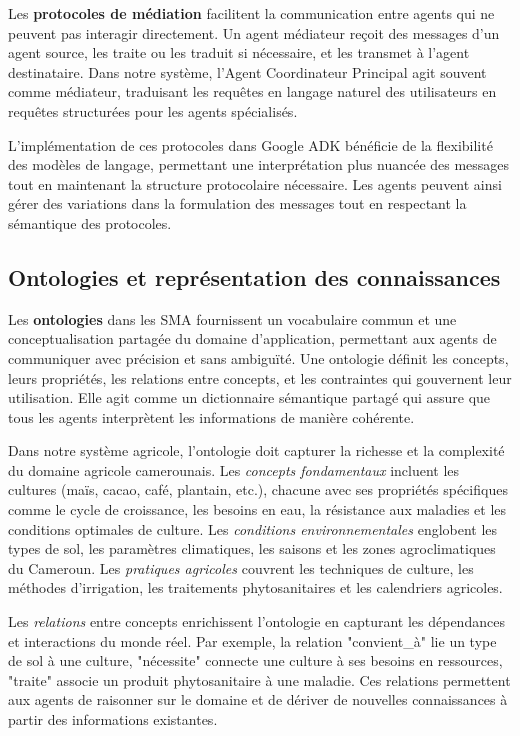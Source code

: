 Les \textbf{protocoles de médiation} facilitent la communication entre agents qui ne peuvent pas interagir directement. Un agent médiateur reçoit des messages d'un agent source, les traite ou les traduit si nécessaire, et les transmet à l'agent destinataire. Dans notre système, l'Agent Coordinateur Principal agit souvent comme médiateur, traduisant les requêtes en langage naturel des utilisateurs en requêtes structurées pour les agents spécialisés.

L'implémentation de ces protocoles dans Google ADK bénéficie de la flexibilité des modèles de langage, permettant une interprétation plus nuancée des messages tout en maintenant la structure protocolaire nécessaire. Les agents peuvent ainsi gérer des variations dans la formulation des messages tout en respectant la sémantique des protocoles.

\subsection{Ontologies et représentation des connaissances}

Les \textbf{ontologies} dans les SMA fournissent un vocabulaire commun et une conceptualisation partagée du domaine d'application, permettant aux agents de communiquer avec précision et sans ambiguïté. Une ontologie définit les concepts, leurs propriétés, les relations entre concepts, et les contraintes qui gouvernent leur utilisation. Elle agit comme un dictionnaire sémantique partagé qui assure que tous les agents interprètent les informations de manière cohérente.

Dans notre système agricole, l'ontologie doit capturer la richesse et la complexité du domaine agricole camerounais. Les \emph{concepts fondamentaux} incluent les cultures (maïs, cacao, café, plantain, etc.), chacune avec ses propriétés spécifiques comme le cycle de croissance, les besoins en eau, la résistance aux maladies et les conditions optimales de culture. Les \emph{conditions environnementales} englobent les types de sol, les paramètres climatiques, les saisons et les zones agroclimatiques du Cameroun. Les \emph{pratiques agricoles} couvrent les techniques de culture, les méthodes d'irrigation, les traitements phytosanitaires et les calendriers agricoles.

Les \emph{relations} entre concepts enrichissent l'ontologie en capturant les dépendances et interactions du monde réel. Par exemple, la relation "convient\_à" lie un type de sol à une culture, "nécessite" connecte une culture à ses besoins en ressources, "traite" associe un produit phytosanitaire à une maladie. Ces relations permettent aux agents de raisonner sur le domaine et de dériver de nouvelles connaissances à partir des informations existantes.

